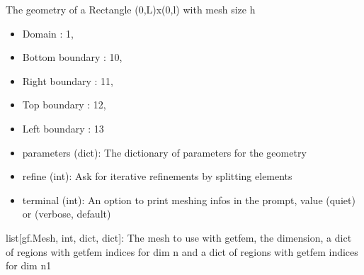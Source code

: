 \documentclass[letterpaper,10pt,english]{sphinxmanual}
\begin{document}

\begin{fulllineitems}
\label{\detokenize{scrimp.utils:scrimp.utils.mesh.Rectangle}}
\pysigstartsignatures
\pysiglinewithargsret
{}
{\sphinxparamcomma {}\sphinxparamcomma {}\sphinxparamcomma {}}
{}
\pysigstopsignatures
\sphinxAtStartPar
The geometry of a Rectangle (0,L)x(0,l) with mesh size h
\begin{itemize}
\item {} 
\sphinxAtStartPar
Domain : 1,

\item {} 
\sphinxAtStartPar
Bottom boundary : 10,

\item {} 
\sphinxAtStartPar
Right boundary : 11,

\item {} 
\sphinxAtStartPar
Top boundary : 12,

\item {} 
\sphinxAtStartPar
Left boundary : 13

\end{itemize}
\begin{description}
\begin{itemize}
\item {} 
\sphinxAtStartPar
parameters (dict): The dictionary of parameters for the geometry

\item {} 
\sphinxAtStartPar
refine (int): Ask for iterative refinements by splitting elements

\item {} 
\sphinxAtStartPar
terminal (int): An option to print meshing infos in the prompt, value  (quiet) or  (verbose, default)

\end{itemize}

\sphinxAtStartPar
list{[}gf.Mesh, int, dict, dict{]}: The mesh to use with getfem, the dimension, a dict of regions with getfem indices for dim n and a dict of regions with getfem indices for dim n\sphinxhyphen{}1

\end{description}

\end{fulllineitems}
\end{document}
